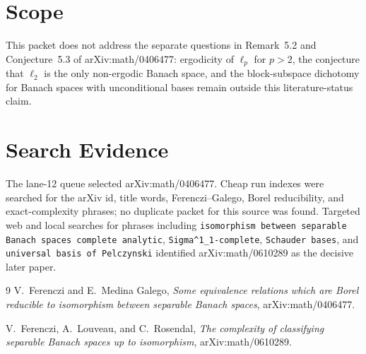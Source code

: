 \documentclass[11pt]{article}
\begin{document}
\section*{Scope}

This packet does not address the separate questions in Remark~5.2 and
Conjecture~5.3 of arXiv:math/0406477: ergodicity of \(\ell_p\) for \(p>2\),
the conjecture that \(\ell_2\) is the only non-ergodic Banach space, and the
block-subspace dichotomy for Banach spaces with unconditional bases remain
outside this literature-status claim.

\section*{Search Evidence}

The lane-12 queue selected arXiv:math/0406477.  Cheap run indexes were searched
for the arXiv id, title words, Ferenczi--Galego, Borel reducibility, and
exact-complexity phrases; no duplicate packet for this source was found.
Targeted web and local searches for phrases including
\texttt{isomorphism between separable Banach spaces complete analytic},
\texttt{Sigma\^{}1\_1-complete}, \texttt{Schauder bases}, and
\texttt{universal basis of Pelczynski} identified arXiv:math/0610289 as the
decisive later paper.

\begin{thebibliography}{9}
V.~Ferenczi and E.~Medina Galego,
\emph{Some equivalence relations which are Borel reducible to isomorphism
between separable Banach spaces},
arXiv:math/0406477.

V.~Ferenczi, A.~Louveau, and C.~Rosendal,
\emph{The complexity of classifying separable Banach spaces up to isomorphism},
arXiv:math/0610289.
\end{thebibliography}
\end{document}
